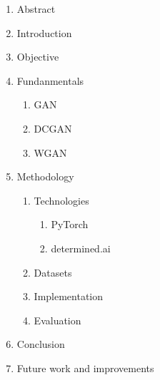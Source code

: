 \documentclass[]{article}
\begin{document}
\noindent
\begin{enumerate}
  \item Abstract
  \item Introduction
  \item Objective
  \item Fundanmentals
  \begin{enumerate}
      \item GAN \cite{goodfellow2014generative}
      \item DCGAN \cite{radford2016dcgan}
      \item WGAN \cite{arjovsky2017wgan, gulrajani2017wgangp}
  \end{enumerate}
  \item Methodology
  \begin{enumerate}
    \item Technologies
    \begin{enumerate}
        \item PyTorch \cite{paszke2019pytorch}
        \item determined.ai
    \end{enumerate}
    \item Datasets
    \item Implementation
    \item Evaluation
  \end{enumerate}
  \item Conclusion
  \item Future work and improvements
\end{enumerate}

\newpage

\printbibliography
\end{document}
